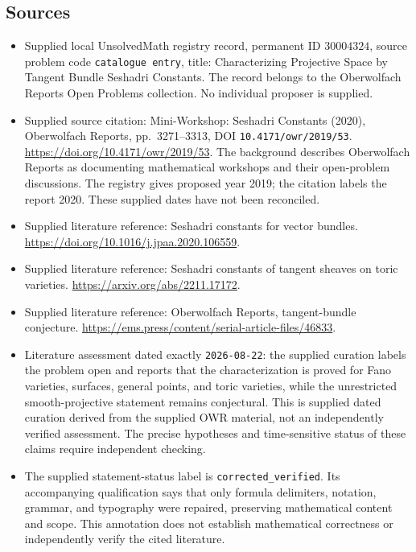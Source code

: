 \documentclass[11pt]{article}
\begin{document}
\subsection{Sources}
\begin{itemize}
\item Supplied local UnsolvedMath registry record, permanent ID \(30004324\), source problem code \texttt{catalogue entry}, title: Characterizing Projective Space by Tangent Bundle Seshadri Constants. The record belongs to the Oberwolfach Reports Open Problems collection. No individual proposer is supplied.
\item Supplied source citation: Mini-Workshop: Seshadri Constants (2020), Oberwolfach Reports, pp.\ 3271--3313, DOI \texttt{10.4171/owr/2019/53}. \url{https://doi.org/10.4171/owr/2019/53}. The background describes Oberwolfach Reports as documenting mathematical workshops and their open-problem discussions. The registry gives proposed year 2019; the citation labels the report 2020. These supplied dates have not been reconciled.
\item Supplied literature reference: Seshadri constants for vector bundles. \url{https://doi.org/10.1016/j.jpaa.2020.106559}.
\item Supplied literature reference: Seshadri constants of tangent sheaves on toric varieties. \url{https://arxiv.org/abs/2211.17172}.
\item Supplied literature reference: Oberwolfach Reports, tangent-bundle conjecture. \url{https://ems.press/content/serial-article-files/46833}.
\item Literature assessment dated exactly \texttt{2026-08-22}: the supplied curation labels the problem open and reports that the characterization is proved for Fano varieties, surfaces, general points, and toric varieties, while the unrestricted smooth-projective statement remains conjectural. This is supplied dated curation derived from the supplied OWR material, not an independently verified assessment. The precise hypotheses and time-sensitive status of these claims require independent checking.
\item The supplied statement-status label is \texttt{corrected\_verified}. Its accompanying qualification says that only formula delimiters, notation, grammar, and typography were repaired, preserving mathematical content and scope. This annotation does not establish mathematical correctness or independently verify the cited literature.
\end{itemize}
\end{document}
